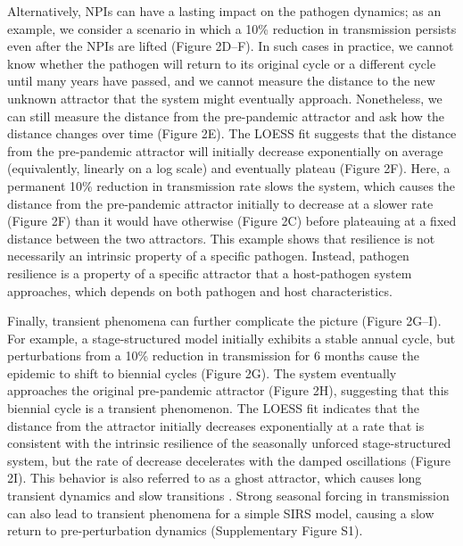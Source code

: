 \documentclass[12pt]{article}
\newcommand{\comment}{\showcomment}
\newcommand{\showcomment}[3]{\textcolor{#1}{\textbf{[#2: }\textsl{#3}\textbf{]}}}
\newcommand{\swp}[1]{\comment{magenta}{SWP}{#1}}
\begin{document}
Alternatively, NPIs can have a lasting impact on the pathogen dynamics; 
as an example, we consider a scenario in which a 10\% reduction in transmission persists even after the NPIs are lifted (Figure 2D--F).
In such cases in practice, we cannot know whether the pathogen will return to its original cycle or a different cycle until many years have passed, and we cannot measure the distance to the new unknown attractor that the system might eventually approach.
Nonetheless, we can still measure the distance from the pre-pandemic attractor and ask how the distance changes over time (Figure 2E).
The LOESS fit suggests that the distance from the pre-pandemic attractor will initially decrease exponentially on average (equivalently, linearly on a log scale) and eventually plateau (Figure 2F).
Here, a permanent 10\% reduction in transmission rate slows the system, which causes the distance from the pre-pandemic attractor initially to decrease at a slower rate (Figure 2F) than it would have otherwise (Figure 2C) before plateauing at a fixed distance between the two attractors.
This example shows that resilience is not necessarily an intrinsic property of a specific pathogen.
Instead, pathogen resilience is a property of a specific attractor that a host-pathogen system approaches, which depends on both pathogen and host characteristics.

Finally, transient phenomena can further complicate the picture (Figure 2G--I).
For example, a stage-structured model initially exhibits a stable annual cycle, but perturbations from a 10\% reduction in transmission for 6 months cause the epidemic to shift to biennial cycles (Figure 2G).
The system eventually approaches the original pre-pandemic attractor (Figure 2H), suggesting that this biennial cycle is a transient phenomenon.
The LOESS fit indicates that the distance from the attractor initially decreases exponentially at a rate that is consistent with the intrinsic resilience of the seasonally unforced stage-structured system, but the rate of decrease decelerates with the damped oscillations (Figure 2I).
This behavior is also referred to as a ghost attractor, which causes long transient dynamics and slow transitions \citep{hastings2018transient}.
Strong seasonal forcing in transmission can also lead to transient phenomena for a simple SIRS model, causing a slow return to pre-perturbation dynamics (Supplementary Figure S1).
\end{document}
